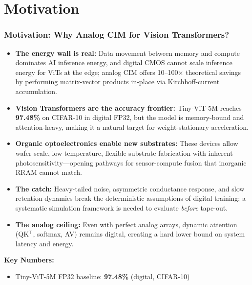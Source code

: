 \documentclass[aspectratio=169,11pt]{beamer}
\newcommand{\dataset}[1]{\textsc{#1}}
\begin{document}

\section{Motivation}
\begin{frame}
  \frametitle{Motivation: Why Analog CIM for Vision Transformers?}
  \begin{itemize}
    \item \textbf{The energy wall is real:} Data movement between memory and compute dominates AI inference energy, and digital CMOS cannot scale inference energy for ViTs at the edge; analog CIM offers 10--100$\times$ theoretical savings by performing matrix-vector products in-place via Kirchhoff-current accumulation.
    \item \textbf{Vision Transformers are the accuracy frontier:} Tiny-ViT-5M reaches \textbf{97.48\%} on \dataset{CIFAR-10} in digital FP32, but the model is memory-bound and attention-heavy, making it a natural target for weight-stationary acceleration.
    \item \textbf{Organic optoelectronics enable new substrates:} These devices allow wafer-scale, low-temperature, flexible-substrate fabrication with inherent photosensitivity---opening pathways for sensor-compute fusion that inorganic RRAM cannot match.
    \item \textbf{The catch:} Heavy-tailed noise, asymmetric conductance response, and slow retention dynamics break the deterministic assumptions of digital training; a systematic simulation framework is needed to evaluate \emph{before} tape-out.
    \item \textbf{The analog ceiling:} Even with perfect analog arrays, dynamic attention (QK$^\top$, softmax, AV) remains digital, creating a hard lower bound on system latency and energy.
  \end{itemize}
  \vfill
  \textbf{Key Numbers:}
  \begin{itemize}
    \item Tiny-ViT-5M FP32 baseline: \textbf{97.48\%} (digital, \dataset{CIFAR-10})

\end{itemize}
\end{frame}
\end{document}
